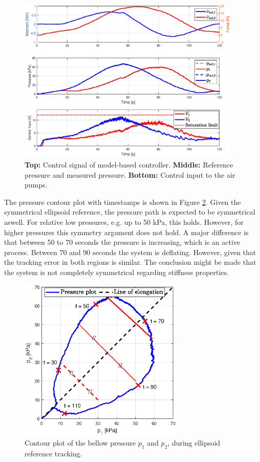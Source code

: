 \begin{figure}[H]
    \centering
    \includegraphics[width = 0.95\textwidth]{Figures/Chapter5/inputsellips.eps}
    \caption{\textbf{Top:} Control signal of model-based controller. \textbf{Middle:} Reference pressure and measured pressure. \textbf{Bottom:} Control input to the air pumps.}
    \label{fig5:controlellips}
\end{figure}


The pressure contour plot with timestamps is shown in Figure \ref{fig5:pressureellips}. Given the symmetrical ellipsoid reference, the pressure path is expected to be symmetrical aswell. For relative low pressures, e.g. up to 50 kPa, this holds. However, for higher pressures this symmetry argument does not hold. A major difference is that between 50 to 70 seconds the pressure is increasing, which is an active process. Between 70 and 90 seconds the system is deflating. However, given that the tracking error in both regions is similar. The conclusion might be made that the system is not completely symmetrical regarding stiffness properties. 




\begin{figure}[H] 
       \centering
    \includegraphics[width = 0.7\textwidth]{Figures/Chapter5/pcontourellips.eps}
    \caption{Contour plot of the bellow pressure $p_1$ and $p_2$, during ellipsoid reference tracking.}
    \label{fig5:pressureellips}
\end{figure}


